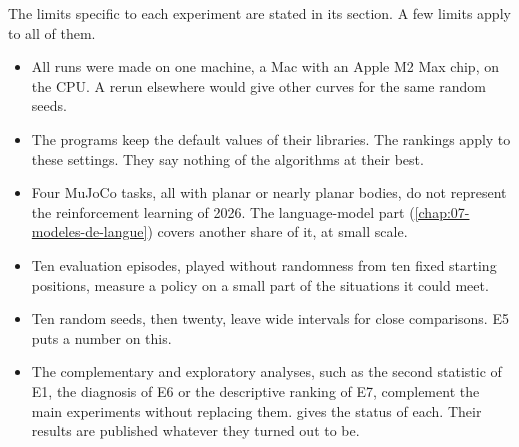 The limits specific to each experiment are stated in its section. A few limits apply to all of them.
\begin{itemize}
  \item All runs were made on one machine, a Mac with an Apple M2 Max chip, on the CPU. A rerun elsewhere
    would give other curves for the same random seeds.
  \item The programs keep the default values of their libraries. The rankings apply to these settings. They
    say nothing of the algorithms at their best.
  \item Four MuJoCo tasks, all with planar or nearly planar bodies, do not represent the reinforcement learning
    of 2026. The language-model part (\cref{chap:07-modeles-de-langue}) covers another share of it, at small
    scale.
  \item Ten evaluation episodes, played without randomness from ten fixed starting positions, measure a policy
    on a small part of the situations it could meet.
  \item Ten random seeds, then twenty, leave wide intervals for close comparisons. E5 puts a number on this.
  \item The complementary and exploratory analyses, such as the second statistic of E1, the diagnosis of E6
    or the descriptive ranking of E7, complement the main experiments without replacing them.
     gives the status of each. Their results are published whatever they turned out
    to be.
  
\end{itemize}
